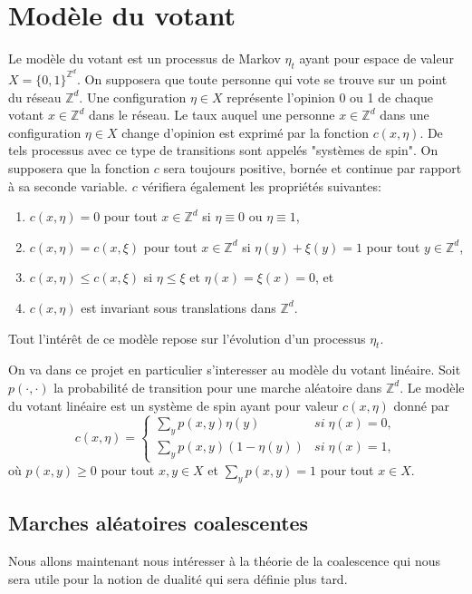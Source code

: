 \documentclass[a4paper,11pt]{article}
\theoremstyle{break}
\theoremstyle{break}
\theoremstyle{definition}
\theoremstyle{remark}
\begin{document}
\section{Modèle du votant}
Le modèle du votant est un processus de Markov $\eta_t$ ayant pour espace de valeur $X=\{0,1\}^{\mathbb{Z}^d}$. On supposera que toute personne qui vote se trouve sur un point du réseau $\mathbb{Z}^d$. Une configuration $\eta\in X$ représente l'opinion 0 ou 1 de chaque votant $x\in\mathbb{Z}^d$ dans le réseau. Le taux auquel une personne $x\in\mathbb{Z}^d$ dans une configuration $\eta\in X$ change d'opinion est exprimé par la fonction $c(x,\eta)$. De tels processus avec ce type de transitions sont appelés "systèmes de spin". On supposera que la fonction $c$ sera toujours positive, bornée et continue par rapport à sa seconde variable. $c$ vérifiera également les propriétés suivantes:
\begin{enumerate}
\item $c(x,\eta)=0$ pour tout $x\in\mathbb{Z}^d$ si $\eta\equiv 0$ ou $\eta\equiv 1$,
\item $c(x,\eta)=c(x,\xi)$ pour tout $x\in\mathbb{Z}^d$ si $\eta (y) + \xi (y) =1$ pour tout $y\in\mathbb{Z}^d$,
\item $c(x,\eta ) \leq c(x,\xi)$ si $\eta\leq\xi$ et $\eta(x) = \xi(x) = 0$, et
\item $c(x,\eta)$ est invariant sous translations dans $\mathbb{Z}^d$.
\end{enumerate}
Tout l’intérêt de ce modèle repose sur l'évolution d'un processus $\eta_t$.

On va dans ce projet en particulier s'interesser au modèle du votant linéaire. Soit $p(\cdot,\cdot)$ la probabilité de transition pour une marche aléatoire dans $\mathbb{Z}^d$. Le modèle du votant linéaire est un système de spin ayant pour valeur $c(x,\eta)$ donné par
$$
c(x,\eta)=\left\{\begin{array}{ll}
\sum\limits_y p(x,y)\eta (y) & si\; \eta(x)=0,\\
\sum\limits_y p(x,y)(1-\eta (y))&si\; \eta(x)=1,
\end{array}\right.
$$
où $p(x,y)\geq 0$ pour tout $x,y\in X$ et $\sum\limits_y p(x,y)=1$ pour tout $x\in X$.

\subsection{Marches aléatoires coalescentes}
Nous allons maintenant nous intéresser à la théorie de la coalescence qui nous sera utile pour la notion de dualité qui sera définie plus tard. 
\end{document}
